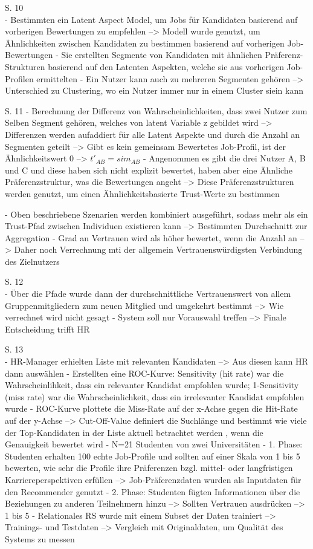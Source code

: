 S. 10\\
- Bestimmten ein Latent Aspect Model, um Jobs für Kandidaten basierend auf vorherigen Bewertungen zu empfehlen --> Modell wurde genutzt, um Ähnlichkeiten zwischen Kandidaten zu bestimmen basierend auf vorherigen Job-Bewertungen
- Sie erstellten Segmente von Kandidaten mit ähnlichen Präferenz-Strukturen basierend auf den Latenten Aspekten, welche sie aus vorherigen Job-Profilen ermittelten
- Ein Nutzer kann auch zu mehreren Segmenten gehören --> Unterschied zu Clustering, wo ein Nutzer immer nur in einem Cluster siein kann

S. 11
- Berechnung der Differenz von Wahrscheinlichkeiten, dass zwei Nutzer zum Selben Segment gehören, welches von latent Variable z gebildet wird --> Differenzen werden aufaddiert für alle Latent Aspekte und durch die Anzahl an Segmenten geteilt --> Gibt es kein gemeinsam Bewertetes Job-Profil, ist der Ähnlichkeitswert 0 --> $t'_{AB}=sim_{AB}$
- Angenommen es gibt die drei Nutzer A, B und C und diese haben sich nicht explizit bewertet, haben aber eine Ähnliche Präferenzstruktur, was die Bewertungen angeht --> Diese Präferenzstrukturen werden genutzt, um einen Ähnlichkeitsbasierte Trust-Werte zu bestimmen

- Oben beschriebene Szenarien werden kombiniert ausgeführt, sodass mehr als ein Trust-Pfad zwischen Individuen existieren kann --> Bestimmten Durchschnitt zur Aggregation
- Grad an Vertrauen wird als höher bewertet, wenn die Anzahl an --> Daher noch Verrechnung mti der allgemein Vertrauenswürdigsten Verbindung des Zielnutzers

S. 12\\
- Über die Pfade wurde dann der durchschnittliche Vertrauenswert von allem Gruppenmitgliedern zum neuen Mitglied und umgekehrt bestimmt --> Wie verrechnet wird nicht gesagt
- System soll nur Vorauswahl treffen --> Finale Entscheidung trifft HR

S. 13\\
- HR-Manager erhielten Liste mit relevanten Kandidaten --> Aus diesen kann HR dann auswählen
- Erstellten eine ROC-Kurve: Sensitivity (hit rate) war die Wahrscheinlihkeit, dass ein relevanter Kandidat empfohlen wurde; 1-Sensitivity (miss rate) war die Wahrscheinlichkeit, dass ein irrelevanter Kandidat empfohlen wurde
- ROC-Kurve plottete die Miss-Rate auf der x-Achse gegen die Hit-Rate auf der y-Achse --> Cut-Off-Value definiert die Suchlänge und bestimmt wie viele der Top-Kandidaten in der Liste aktuell betrachtet werden , wenn die Genauigkeit bewertet wird
- N=21 Studenten von zwei Universitäten
- 1. Phase: Studenten erhalten 100 echte Job-Profile und sollten auf einer Skala von 1 bis 5 bewerten, wie sehr die Profile ihre Präferenzen bzgl. mittel- oder langfristigen Karriereperspektiven erfüllen --> Job-Präferenzdaten wurden als Inputdaten für den Recommender genutzt
- 2. Phase: Studenten fügten Informationen über die Beziehungen zu anderen Teilnehmern hinzu --> Sollten Vertrauen ausdrücken --> 1 bis 5
- Relationales RS wurde mit einem Subset der Daten trainiert --> Trainings- und Testdaten --> Vergleich mit Originaldaten, um Qualität des Systems zu messen

